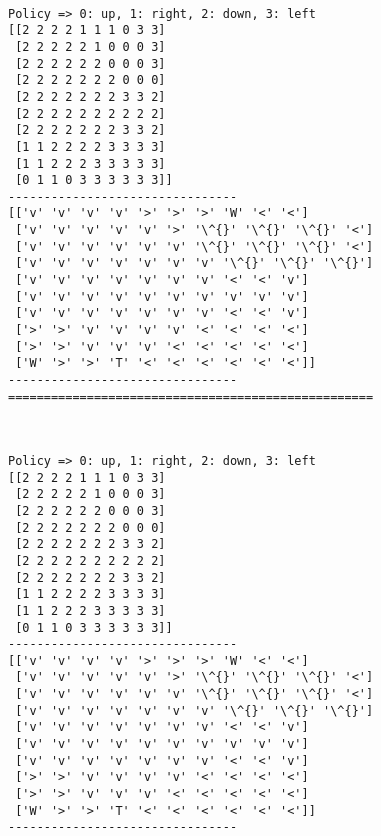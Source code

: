 \documentclass[11pt]{article}
\begin{document}
    \begin{center}
    \end{center}
    { \hspace*{\fill} \\}
    
    \begin{Verbatim}[commandchars=\\\{\}]
Policy => 0: up, 1: right, 2: down, 3: left
[[2 2 2 2 1 1 1 0 3 3]
 [2 2 2 2 2 1 0 0 0 3]
 [2 2 2 2 2 2 0 0 0 3]
 [2 2 2 2 2 2 2 0 0 0]
 [2 2 2 2 2 2 2 3 3 2]
 [2 2 2 2 2 2 2 2 2 2]
 [2 2 2 2 2 2 2 3 3 2]
 [1 1 2 2 2 2 3 3 3 3]
 [1 1 2 2 2 3 3 3 3 3]
 [0 1 1 0 3 3 3 3 3 3]]
--------------------------------
[['v' 'v' 'v' 'v' '>' '>' '>' 'W' '<' '<']
 ['v' 'v' 'v' 'v' 'v' '>' '\^{}' '\^{}' '\^{}' '<']
 ['v' 'v' 'v' 'v' 'v' 'v' '\^{}' '\^{}' '\^{}' '<']
 ['v' 'v' 'v' 'v' 'v' 'v' 'v' '\^{}' '\^{}' '\^{}']
 ['v' 'v' 'v' 'v' 'v' 'v' 'v' '<' '<' 'v']
 ['v' 'v' 'v' 'v' 'v' 'v' 'v' 'v' 'v' 'v']
 ['v' 'v' 'v' 'v' 'v' 'v' 'v' '<' '<' 'v']
 ['>' '>' 'v' 'v' 'v' 'v' '<' '<' '<' '<']
 ['>' '>' 'v' 'v' 'v' '<' '<' '<' '<' '<']
 ['W' '>' '>' 'T' '<' '<' '<' '<' '<' '<']]
--------------------------------
===================================================

    \end{Verbatim}

    \begin{center}
    \end{center}
    { \hspace*{\fill} \\}
    
    \begin{Verbatim}[commandchars=\\\{\}]
Policy => 0: up, 1: right, 2: down, 3: left
[[2 2 2 2 1 1 1 0 3 3]
 [2 2 2 2 2 1 0 0 0 3]
 [2 2 2 2 2 2 0 0 0 3]
 [2 2 2 2 2 2 2 0 0 0]
 [2 2 2 2 2 2 2 3 3 2]
 [2 2 2 2 2 2 2 2 2 2]
 [2 2 2 2 2 2 2 3 3 2]
 [1 1 2 2 2 2 3 3 3 3]
 [1 1 2 2 2 3 3 3 3 3]
 [0 1 1 0 3 3 3 3 3 3]]
--------------------------------
[['v' 'v' 'v' 'v' '>' '>' '>' 'W' '<' '<']
 ['v' 'v' 'v' 'v' 'v' '>' '\^{}' '\^{}' '\^{}' '<']
 ['v' 'v' 'v' 'v' 'v' 'v' '\^{}' '\^{}' '\^{}' '<']
 ['v' 'v' 'v' 'v' 'v' 'v' 'v' '\^{}' '\^{}' '\^{}']
 ['v' 'v' 'v' 'v' 'v' 'v' 'v' '<' '<' 'v']
 ['v' 'v' 'v' 'v' 'v' 'v' 'v' 'v' 'v' 'v']
 ['v' 'v' 'v' 'v' 'v' 'v' 'v' '<' '<' 'v']
 ['>' '>' 'v' 'v' 'v' 'v' '<' '<' '<' '<']
 ['>' '>' 'v' 'v' 'v' '<' '<' '<' '<' '<']
 ['W' '>' '>' 'T' '<' '<' '<' '<' '<' '<']]
--------------------------------

    \end{Verbatim}
\end{document}
